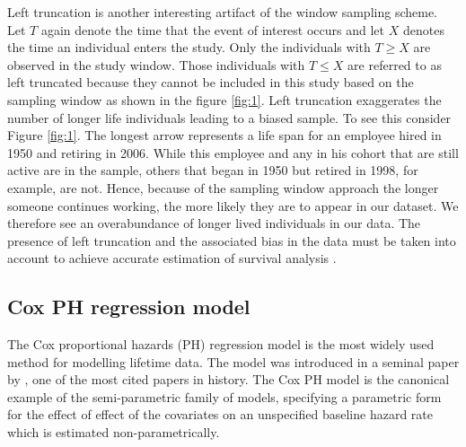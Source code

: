 \documentclass[12pt,letterpaper]{article}
\begin{document}
 Left truncation is another interesting artifact of the window sampling scheme. Let $T$ again denote the time that the event of interest occurs and let $X$ denotes the time an individual enters the study. Only the individuals with $T \geq X$ are observed in the study window.  Those individuals with $T \leq X$ are referred to as left truncated because they cannot be included in this study based on the sampling window as shown in the figure \ref{fig:1}. Left truncation exaggerates the number of longer life individuals leading to a biased sample. To see this consider Figure \ref{fig:1}. The longest arrow represents a life span for an employee hired in 1950 and retiring in 2006. While this employee and any in his cohort that are still active are in the sample, others that began in 1950 but retired in 1998, for example, are not. Hence, because of the sampling window approach the longer someone continues working, the more likely they are to appear in our dataset.  We therefore see an overabundance of longer lived individuals in our data.  The presence of left truncation and the associated bias in the data must be taken into account to achieve accurate estimation of survival analysis \citep{carrion2010}.



\subsection{Cox PH regression model}
The Cox proportional hazards (PH) regression model is the most widely used method for modelling lifetime data. The model was introduced in a seminal paper by \citet{cox1972}, one of the most cited papers in history. The Cox PH model is the canonical example of the semi-parametric family of models, specifying a parametric form for the effect of effect of the covariates on an unspecified baseline hazard rate which is estimated non-parametrically.
\end{document}

